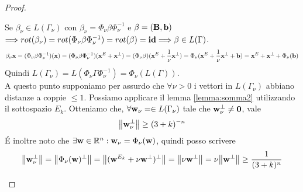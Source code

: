 \documentclass[a4paper,11pt,openright,twoside	]{book}
\begin{document}
\begin{proof}
\begin{itemize}
Se $\beta_{\nu} \in L(\Gamma_{\nu}) $ con  $ \beta_{\nu} = \Phi_{\nu} \beta \Phi_{\nu}^{-1}  $ e $\beta = (\vb{B, b}) $ $ \Longrightarrow rot(\beta_{\nu}) = rot(\Phi_{\nu} \beta \Phi_{\nu}^{-1}) = rot(\beta) = \vb{id}  \Longrightarrow \beta \in L(\Gamma)$. \\
\[\beta_{\nu} \vb{x} = (\Phi_{\nu} \beta \Phi_{\nu}^{-1})(\vb{x}) = (\Phi_{\nu} \beta \Phi_{\nu}^{-1})(\vb{x}^E + \vb{x}^{\perp}) =  
 (\Phi_{\nu} \beta)(\vb{x}^E + \frac{1}{\nu}\vb{x}^{\perp}) =  \Phi_{\nu}(\vb{x}^E + \frac{1}{\nu}\vb{x}^{\perp} + \vb{b}) = \vb{x}^E + \vb{x}^{\perp} + \Phi_{\nu}(\vb{b}) \] 
Quindi  $L(\Gamma_{\nu})  = L(\Phi_{\nu} \Gamma \Phi_{\nu}^{-1}) = \Phi_{\nu}(L(\Gamma))$. \\
A questo punto supponiamo per assurdo che $\forall \nu >0 $ i vettori in  $L(\Gamma_{\nu})$ abbiano distanze a coppie $\leq 1$. Possiamo applicare il lemma  \ref{lemma:somma2} utilizzando il sottospazio $E_k$. Otteniamo che, $\forall \vb{w}_{\nu} = \in L(\Gamma_{\nu})$ tale che $\vb{w}_{\nu}^{\perp} \neq \vb{0}$,  vale 
\[ \norm{\vb{w}_{\nu}^{\perp}} \geq (3 + k)^{-n}\]
\'E inoltre noto che $\exists \vb{w} \in \mathbb{R}^n : \vb{w}_{\nu} = \Phi_{\nu}(\vb{w})$, quindi posso scrivere
\begin{equation}
\label{eq:nu}
\norm{\vb{w}_{\nu}^{\perp}} = \norm{\Phi_{\nu}(\vb{w})^{\perp}} = \norm{ (\vb{w}^{E_k} + \nu \vb{w}^{\perp})^{\perp}} = \norm{\nu \vb{w}^{\perp}} = \nu \norm{\vb{w}^{\perp}}\geq \frac{1}{(3 + k)^{n}}
\end{equation}


\end{itemize}
\end{proof}
\end{document}
